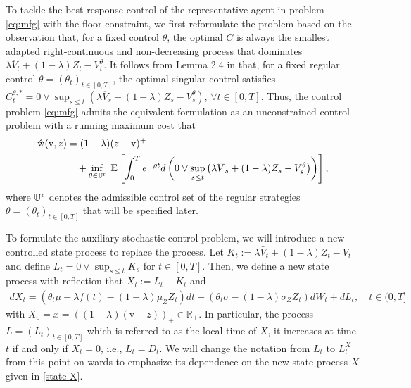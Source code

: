 \documentclass[11pt,times,letter]{article}
\newcommand{\Ex}{ \mathbb{E} }
\newcommand{\R}{\mathds{R}}
\numberwithin{equation}{section}
\begin{document}
To tackle the best response control of the representative agent in problem \eqref{eq:mfg} with the floor constraint, we first reformulate the problem based on the observation that, for a fixed control $\theta$, the optimal $C$ is always the smallest adapted right-continuous and non-decreasing process that dominates $\lambda \overline{V}_t +(1-\lambda )Z_t-V_t^{\theta}$. It follows from Lemma 2.4 in \cite{BoLiaoYu21} that,  for a fixed regular control $\theta=(\theta_t)_{t\in[0,T]}$, the optimal singular control satisfies $C^{\theta,*}_t =0\vee \sup_{s\leq t}\left(\lambda \overline{V}_s +(1-\lambda )Z_s-V_{s}^{\theta}\right)$, $\forall t\in [0,T]$. Thus, the control problem \eqref{eq:mfg} admits the equivalent formulation as an unconstrained control problem with a running maximum cost that
\begin{align}\label{eq_orig_pb-mfg}
\hat{{\rm w}}(\mathrm{v},z)&=(1-\lambda)(z-\mathrm{v})^+\nonumber\\
&\quad+\inf_{\theta\in\mathbb{U}^{\rm r}}\ \Ex\left[ \int_0^{T} e^{-\rho t} d\left(0\vee \sup_{s\leq t}\left(\lambda \overline{V}_s +(1-\lambda )Z_s-V_{s}^{\theta}\right)\right)\right],
\end{align}
where $\mathbb{U}^{\rm r}$ denotes the admissible control set of the regular strategies $\theta=(\theta_t)_{t\in[0,T]}$ that will be specified later.

To formulate the auxiliary stochastic control problem, we will introduce a new controlled state
process to replace the process. Let $K_t:=\lambda \bar{V}_t+(1-\lambda )Z_t-V_t$ and define $L_t=0\vee \sup_{s\leq t}K_s$ for $t\in[0,T]$. Then, we define a new state process with reflection that $X_t:=L_t-K_t$ and 
\begin{align}\label{state-X}
dX_t=(\theta_t \mu -\lambda f(t)-(1-\lambda)\mu_Z Z_t)dt+(\theta_t\sigma-(1-\lambda)\sigma_Z Z_t )dW_t+dL_t,\quad t\in (0,T]
\end{align}
with $X_0=x=((1-\lambda)(\mathrm{v}-z))_+\in\R_+$. In particular, the process $L=(L_t)_{t\in[0,T]}$ which is referred to as the local time of $X$, it increases at time $t$ if and only if $X_t=0$, i.e., $L_t=D_t$. We will change the notation from $L_t$ to $L_t^X$ from this point on wards to emphasize its dependence on the new state process $X$ given in \eqref{state-X}.
\end{document}
